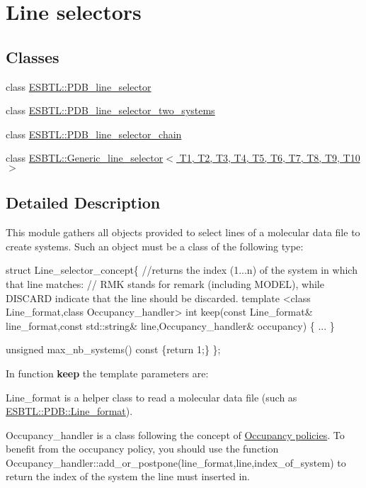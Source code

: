 \hypertarget{group__linesel}{}\section{Line selectors}
\label{group__linesel}
\subsection*{Classes}
\begin{DoxyCompactItemize}
\item 
class \hyperlink{classESBTL_1_1PDB__line__selector}{E\+S\+B\+T\+L\+::\+P\+D\+B\+\_\+line\+\_\+selector}
\item 
class \hyperlink{classESBTL_1_1PDB__line__selector__two__systems}{E\+S\+B\+T\+L\+::\+P\+D\+B\+\_\+line\+\_\+selector\+\_\+two\+\_\+systems}
\item 
class \hyperlink{classESBTL_1_1PDB__line__selector__chain}{E\+S\+B\+T\+L\+::\+P\+D\+B\+\_\+line\+\_\+selector\+\_\+chain}
\item 
class \hyperlink{classESBTL_1_1Generic__line__selector}{E\+S\+B\+T\+L\+::\+Generic\+\_\+line\+\_\+selector$<$ T1, T2, T3, T4, T5, T6, T7, T8, T9, T10 $>$}
\end{DoxyCompactItemize}


\subsection{Detailed Description}
This module gathers all objects provided to select lines of a molecular data file to create systems. Such an object must be a class of the following type\+: 
\begin{DoxyCode}
\textcolor{keyword}{struct }Line\_selector\_concept\{
  \textcolor{comment}{//returns the index (1...n) of the system in which that line matches: }
  \textcolor{comment}{// RMK stands for remark (including MODEL), while DISCARD indicate that the line should be discarded.}
  \textcolor{keyword}{template} <\textcolor{keyword}{class} Line\_format,\textcolor{keyword}{class} Occupancy\_handler>
  \textcolor{keywordtype}{int} keep(\textcolor{keyword}{const} Line\_format& line\_format,\textcolor{keyword}{const} std::string& line,Occupancy\_handler& occupancy)
  \{ ... \}

  \textcolor{keywordtype}{unsigned} max\_nb\_systems()\textcolor{keyword}{ const }\{\textcolor{keywordflow}{return} 1;\}
\};
\end{DoxyCode}
 In function {\bfseries keep} the template parameters are\+:
\begin{DoxyItemize}
\item {\ttfamily Line\+\_\+format} is a helper class to read a molecular data file (such as \hyperlink{classESBTL_1_1PDB_1_1Line__format}{E\+S\+B\+T\+L\+::\+P\+D\+B\+::\+Line\+\_\+format}).
\item {\ttfamily Occupancy\+\_\+handler} is a class following the concept of \hyperlink{group__occpol}{Occupancy policies}. To benefit from the occupancy policy, you should use the function Occupancy\+\_\+handler\+::add\+\_\+or\+\_\+postpone(line\+\_\+format,line,index\+\_\+of\+\_\+system) to return the index of the system the line must inserted in. 
\end{DoxyItemize}